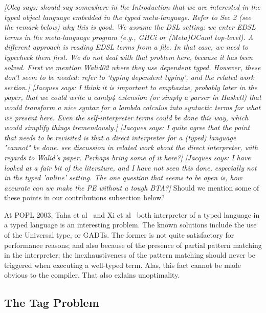 \documentclass[preprint]{sigplanconf}
\newcommand{\jacques}[1]{{\it [Jacques says: #1]}}
\newcommand{\oleg}[1]{{\it [Oleg says: #1]}}
\let\cite=\citep
\begin{document}
\oleg{should say somewhere in the Introduction that we are interested
  in the typed object language embedded in the typed
  meta-language. Refer to Sec 2 (see the remark below) why this is
  good. We assume the DSL setting: we enter EDSL terms in the
  meta-language program (e.g., GHCi or (Meta)OCaml top-level). A
  different approach is reading EDSL terms from a file. In that case, we
  need to typecheck them first. We do not deal with that problem here,
  because it has been solved. First we mention Walid02 where they use
  dependent typed. However, these don't seem to be needed: refer to
  `typing dependent typing', and the related work section.}
\jacques{I think it is important to emphasize, probably later in the 
paper, that we could write a camlp4 extension (or simply a parser in
Haskell) that would transform a nice syntax for a lambda calculus into
syntactic terms for what we present here.  Even the self-interpreter
terms could be done this way, which would simplify things tremendously.}
\jacques{I quite agree that the point that needs to be revisited is
  that a \emph{direct} interpreter for a (typed) language "cannot" be
  done. see discussion in related work about the direct interpreter,
  with regards to Walid's paper. Perhaps bring some of it here?}
\jacques{I have looked at a fair bit of the literature, and I have not
  seen this done, especially not in the typed 'online' setting.  The
  one question that seems to be open is, how accurate can we make the
  PE without a tough BTA?}
Should we mention some of these points in our contributions subsection
below?

    At POPL 2003, Taha et al~\cite{TahaPOPL03} and Xi et al~\cite{XiPOPL03}
both
interpreter of a typed language in a typed language is an interesting
problem. The known solutions include the use of the Universal type, or
GADTs. The former is not quite satisfactory for performance reasons;
and also because of the presence of partial pattern matching in the
interpreter; the inexhaustiveness of the pattern matching should never
be triggered when executing a well-typed term. Alas, this fact cannot
be made obvious to the compiler. That also exlains unoptimality.


\subsection{The Tag Problem}\label{tagproblem}

\end{document}
